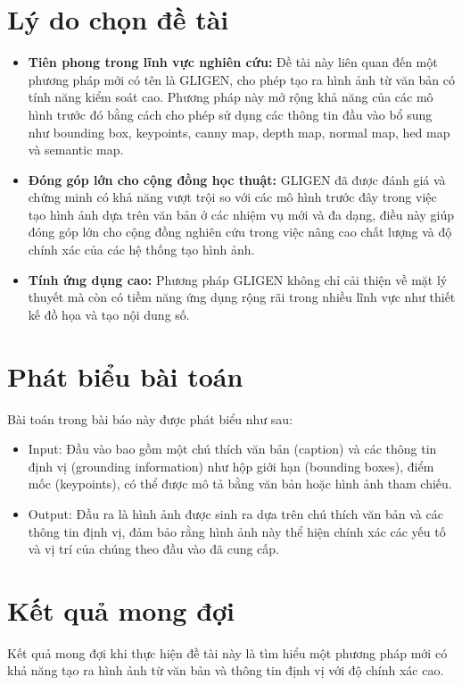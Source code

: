 \documentclass[12pt]{report}
\begin{document}
\section{Lý do chọn đề tài}
\begin{itemize}
	\item \textbf{Tiên phong trong lĩnh vực nghiên cứu:}
	      Đề tài này liên quan đến một phương pháp mới có tên là GLIGEN,
	      cho phép tạo ra hình ảnh từ văn bản có tính năng kiểm soát cao.
	      Phương pháp này mở rộng khả năng của các mô hình trước đó bằng cách cho phép sử dụng các thông tin đầu vào
	      bổ sung như bounding box, keypoints, canny map, depth map, normal map, hed map và semantic map.

	\item \textbf{Đóng góp lớn cho cộng đồng học thuật:}
	      GLIGEN đã được đánh giá và chứng minh có khả năng vượt trội so với các mô hình trước đây
	      trong việc tạo hình ảnh dựa trên văn bản ở các nhiệm vụ mới và đa dạng,
	      điều này giúp đóng góp lớn cho cộng đồng nghiên cứu trong việc nâng cao chất lượng
	      và độ chính xác của các hệ thống tạo hình ảnh.

	\item \textbf{Tính ứng dụng cao:}
	      Phương pháp GLIGEN không chỉ cải thiện về mặt lý thuyết
	      mà còn có tiềm năng ứng dụng rộng rãi trong nhiều lĩnh vực như thiết kế đồ họa
	      và tạo nội dung số.
\end{itemize}

\section{Phát biểu bài toán}

Bài toán trong bài báo này được phát biểu như sau:
\begin{itemize}
	\item Input: Đầu vào bao gồm một chú thích văn bản (caption)
	      và các thông tin định vị (grounding information) như hộp giới hạn (bounding boxes),
	      điểm mốc (keypoints), có thể được mô tả bằng văn bản hoặc hình ảnh tham chiếu.
	\item Output: Đầu ra là hình ảnh được sinh ra dựa trên chú thích văn bản
	      và các thông tin định vị, đảm bảo rằng hình ảnh này thể hiện chính xác các yếu tố
	      và vị trí của chúng theo đầu vào đã cung cấp.
\end{itemize}

\section{Kết quả mong đợi}
Kết quả mong đợi khi thực hiện đề tài này là tìm hiểu một phương pháp mới
có khả năng tạo ra hình ảnh từ văn bản và thông tin định vị với độ chính xác cao.
\end{document}
